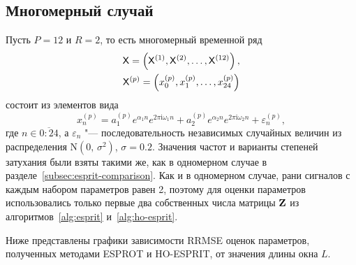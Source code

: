 \documentclass[specialist,
  substylefile=spbu.rtx,
subf,href,colorlinks=true, 12pt]{disser}
\theoremstyle{plain}
\theoremstyle{definition}
\theoremstyle{remark}
\newcommand{\iu}{\mathrm{i}}
\begin{document}
\subsection{Многомерный случай}\label{subsec:mv-esprit-comparison}
Пусть $P=12$ и $R=2$, то есть многомерный временной ряд
\begin{gather*}
  \mathsf{X} = \left(\mathsf{X}^{(1)}, \mathsf{X}^{(2)}, \ldots, \mathsf{X}^{(12)}\right),\\
  \mathsf{X}^{(p)} = \left(x_0^{(p)}, x_1^{(p)}, \ldots, x_{24}^{(p)}\right)
\end{gather*}
состоит из элементов вида
\[
  x_n^{(p)} = a_1^{(p)} e^{ \alpha_1 n }
  e^{2 \pi \iu \omega_1 n} +
  a_2^{(p)} e^{ \alpha_2 n }
  e^{2 \pi \iu \omega_2 n} + \varepsilon_n^{(p)},
\]
где $n \in \overline{0:24}$, а $\varepsilon_n$ "--- последовательность независимых случайных величин из
распределения $\mathrm{N}(0,\, \sigma^2)$, $\sigma=0.2$.
Значения частот и варианты степеней затухания были взяты такими же, как
в одномерном случае в разделе~\ref{subsec:esprit-comparison}.
Как и в одномерном случае, рани сигналов с каждым набором параметров равен 2,
поэтому для оценки параметров использовались только первые два собственных
числа матрицы $\mathbf{Z}$ из алгоритмов~\ref{alg:esprit} и~\ref{alg:ho-esprit}.

Ниже представлены графики зависимости RRMSE оценок параметров,
полученных методами ESPROT и HO-ESPRIT, от значения длины окна $L$.
\end{document}
